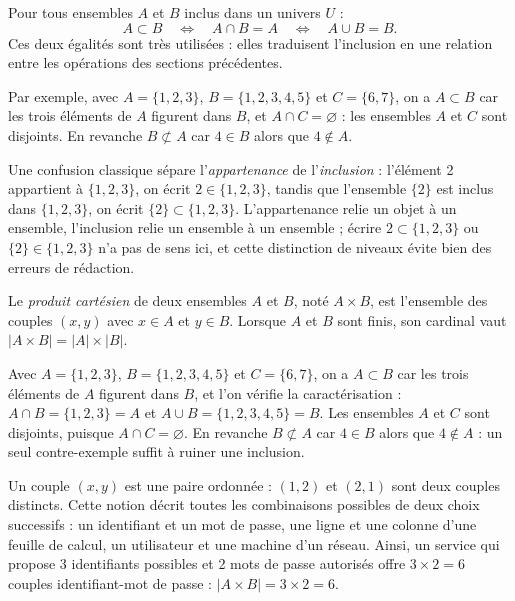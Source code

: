 \begin{propriete}
Pour tous ensembles $A$ et $B$ inclus dans un univers $U$ :
\[
A \subset B \quad\Longleftrightarrow\quad A \cap B = A \quad\Longleftrightarrow\quad A \cup B = B .
\]
Ces deux égalités sont très utilisées : elles traduisent l'inclusion en une relation entre les opérations des sections précédentes.
\end{propriete}

Par exemple, avec $A = \{1, 2, 3\}$, $B = \{1, 2, 3, 4, 5\}$ et $C = \{6, 7\}$, on a $A \subset B$ car les trois éléments de $A$ figurent dans $B$, et $A \cap C = \varnothing$ : les ensembles $A$ et $C$ sont disjoints. En revanche $B \not\subset A$ car $4 \in B$ alors que $4 \notin A$.

Une confusion classique sépare l'\emph{appartenance} de l'\emph{inclusion} : l'élément 2 appartient à $\{1, 2, 3\}$, on écrit $2 \in \{1, 2, 3\}$, tandis que l'ensemble $\{2\}$ est inclus dans $\{1, 2, 3\}$, on écrit $\{2\} \subset \{1, 2, 3\}$. L'appartenance relie un objet à un ensemble, l'inclusion relie un ensemble à un ensemble ; écrire $2 \subset \{1, 2, 3\}$ ou $\{2\} \in \{1, 2, 3\}$ n'a pas de sens ici, et cette distinction de niveaux évite bien des erreurs de rédaction.

\begin{definition}
Le \emph{produit cartésien} de deux ensembles $A$ et $B$, noté $A \times B$, est l'ensemble des couples $(x, y)$ avec $x \in A$ et $y \in B$. Lorsque $A$ et $B$ sont finis, son cardinal vaut $|A \times B| = |A| \times |B|$.
\end{definition}

\begin{exemple}
Avec $A = \{1, 2, 3\}$, $B = \{1, 2, 3, 4, 5\}$ et $C = \{6, 7\}$, on a $A \subset B$ car les trois éléments de $A$ figurent dans $B$, et l'on vérifie la caractérisation : $A \cap B = \{1, 2, 3\} = A$ et $A \cup B = \{1, 2, 3, 4, 5\} = B$. Les ensembles $A$ et $C$ sont disjoints, puisque $A \cap C = \varnothing$. En revanche $B \not\subset A$ car $4 \in B$ alors que $4 \notin A$ : un seul contre-exemple suffit à ruiner une inclusion.
\end{exemple}

Un couple $(x, y)$ est une paire ordonnée : $(1, 2)$ et $(2, 1)$ sont deux couples distincts. Cette notion décrit toutes les combinaisons possibles de deux choix successifs : un identifiant et un mot de passe, une ligne et une colonne d'une feuille de calcul, un utilisateur et une machine d'un réseau. Ainsi, un service qui propose 3 identifiants possibles et 2 mots de passe autorisés offre $3 \times 2 = 6$ couples identifiant-mot de passe : $|A \times B| = 3 \times 2 = 6$.


